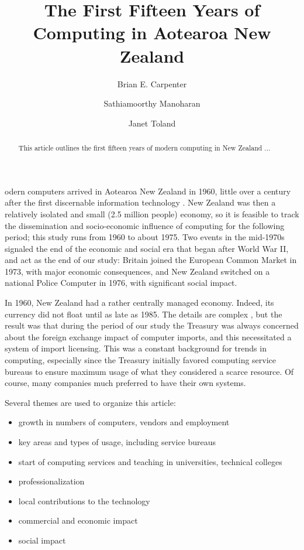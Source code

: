 \documentclass{IEEEcsmag}
\begin{document}

\title{The First Fifteen Years of Computing in Aotearoa New Zealand}

\author{Brian E. Carpenter}

\author{Sathiamoorthy Manoharan}

\author{Janet Toland}



\begin{abstract}This article outlines the first fifteen years of modern computing in New Zealand ... 
\end{abstract}

\maketitle


odern computers arrived in Aotearoa New Zealand in 1960, little over a century after the first discernable information technology \cite{pioneers}. New Zealand was then a relatively isolated and small (2.5 million people) economy, so it is feasible to track the dissemination and socio-economic influence of computing for the following period; this study runs from 1960 to about 1975. Two events in the mid-1970s signaled the end of the economic and social era that began after World War II, and act as the end of our study: Britain joined the European Common Market in 1973, with major economic consequences, and New Zealand switched on a national Police Computer in 1976, with significant social impact.

In 1960, New Zealand had a rather centrally managed economy. Indeed, its currency did not float until as late as 1985. The details are complex \cite{Sullivan2013}, but the result was that during the period of our study the Treasury was always concerned about the foreign exchange impact of computer imports, and this necessitated a system of import licensing. This was a constant background for trends in computing, especially since the Treasury initially favored computing service bureaus to ensure maximum usage of what they considered a scarce resource. Of course, many companies much preferred to have their own systems.

Several themes are used to organize this article:

\begin{itemize}
\item growth in numbers of computers, vendors and employment
\item key areas  and types of usage, including service bureaus
\item start of computing services and teaching in universities, technical colleges
\item professionalization
\item local contributions to the technology
\item commercial and economic impact
\item social impact
\end{itemize}
\end{document}
